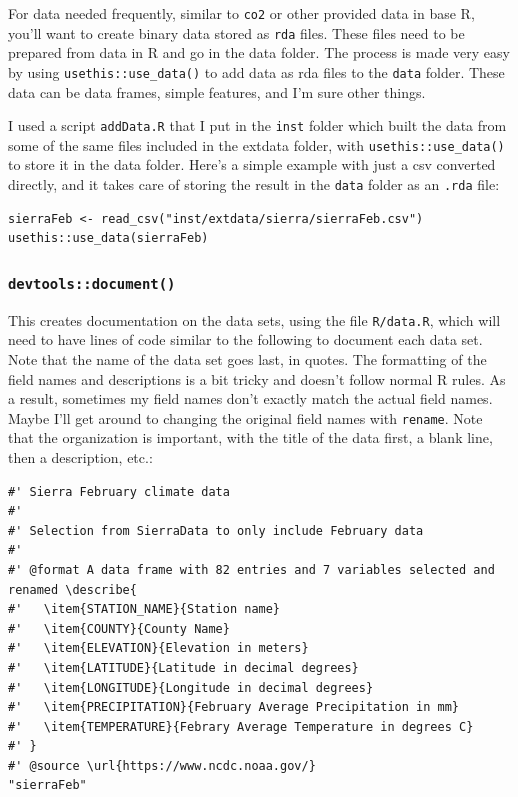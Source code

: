 \documentclass[
]{book}
\begin{document}
For data needed frequently, similar to \texttt{co2} or other provided data in base R, you'll want to create binary data stored as \texttt{rda} files. These files need to be prepared from data in R and go in the data folder. The process is made very easy by using \texttt{usethis::use\_data()} to add data as rda files to the \texttt{data} folder. These data can be data frames, simple features, and I'm sure other things.

I used a script \texttt{addData.R} that I put in the \texttt{inst} folder which built the data from some of the same files included in the extdata folder, with \texttt{usethis::use\_data()} to store it in the data folder. Here's a simple example with just a csv converted directly, and it takes care of storing the result in the \texttt{data} folder as an \texttt{.rda} file:

\begin{verbatim}
sierraFeb <- read_csv("inst/extdata/sierra/sierraFeb.csv")
usethis::use_data(sierraFeb)
\end{verbatim}

\hypertarget{devtoolsdocument}{%
\subsubsection*{\texorpdfstring{\texttt{devtools::document()}}{devtools::document()}}\label{devtoolsdocument}}


This creates documentation on the data sets, using the file \texttt{R/data.R}, which will need to have lines of code similar to the following to document each data set. Note that the name of the data set goes last, in quotes. The formatting of the field names and descriptions is a bit tricky and doesn't follow normal R rules. As a result, sometimes my field names don't exactly match the actual field names. Maybe I'll get around to changing the original field names with \texttt{rename}. Note that the organization is important, with the title of the data first, a blank line, then a description, etc.:

\begin{verbatim}
#' Sierra February climate data
#'
#' Selection from SierraData to only include February data
#'
#' @format A data frame with 82 entries and 7 variables selected and renamed \describe{
#'   \item{STATION_NAME}{Station name}
#'   \item{COUNTY}{County Name}
#'   \item{ELEVATION}{Elevation in meters}
#'   \item{LATITUDE}{Latitude in decimal degrees}
#'   \item{LONGITUDE}{Longitude in decimal degrees}
#'   \item{PRECIPITATION}{February Average Precipitation in mm}
#'   \item{TEMPERATURE}{Febrary Average Temperature in degrees C}
#' }
#' @source \url{https://www.ncdc.noaa.gov/}
"sierraFeb"
\end{verbatim}
\end{document}
